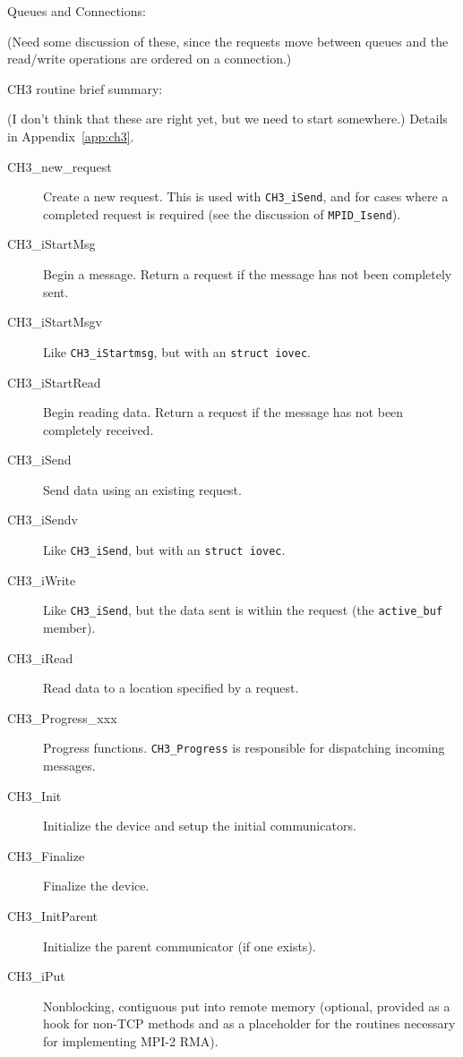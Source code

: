 \documentclass{article}
\def\mpids#1#2{\code{#2}\index{#1!#2}}
\def\code{\begingroup\makeustext\eatcode}
\def\eatcode#1{\texttt{#1}\endgroup}
\begin{document}
Queues and Connections:

(Need some discussion of these, since the requests move between queues and the 
read/write operations are ordered on a connection.)

CH3 routine brief summary:

(I don't think that these are right yet, but we need to start somewhere.)
Details in Appendix~\ref{app:ch3}.

\begin{description}
\item[CH3\_new\_request]Create a new request. This is used with
  \code{CH3_iSend}, and for cases where a completed request is required (see
  the discussion of \code{MPID_Isend}).
\item[CH3\_iStartMsg]Begin a message.  Return a request if the message has not
  been completely sent.
\item[CH3\_iStartMsgv]Like \code{CH3_iStartmsg}, but with an \code{struct
    iovec}.
\item[CH3\_iStartRead]Begin reading data.  Return a request if the message has
  not been completely received.
\item[CH3\_iSend]Send data using an existing request.
\item[CH3\_iSendv]Like \code{CH3_iSend}, but with an \code{struct iovec}.
\item[CH3\_iWrite]Like \code{CH3_iSend}, but the data sent is within the
  request (the \mpids{MPID_Request}{active\_buf} member).
\item[CH3\_iRead]Read data to a location specified by a request.
\item[CH3\_Progress\_xxx]Progress functions.  \code{CH3_Progress} is
  responsible for dispatching incoming messages.
\item[CH3\_Init]Initialize the device and setup the initial communicators.
\item[CH3\_Finalize]Finalize the device.
\item[CH3\_InitParent]Initialize the parent communicator (if one exists).
\item[CH3\_iPut]Nonblocking, contiguous put into remote memory (optional,
  provided as a hook for non-TCP methods and as a placeholder for the
  routines necessary for implementing MPI-2 RMA).
\end{description}
\end{document}
